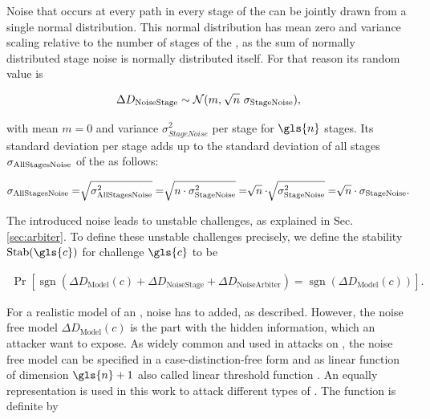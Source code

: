 Noise that occurs at every path in every stage of the \apuf can be jointly drawn from a single normal distribution.
This normal distribution has mean zero and variance scaling relative to the number of stages of the \apuf, as the sum of normally distributed stage noise is normally distributed itself.
For that reason its random value is 

\begin{align}
\Delta D_{\mathrm{Noise Stage}} \sim \mathcal{N} (m,\ \sqrt[]{n}\ \sigma_{\mathrm{Stage Noise}}), \label{equ:stagenoisedistribution}
\end{align}

with mean $m = 0$ and variance $\sigma_{Stage Noise}^2$ per stage for $\gls{n}$ stages.
Its standard deviation per stage adds up to the standard deviation of all stages $\sigma_{\mathrm{All Stages Noise}}$ of the \puf as follows:

\begin{align*}
\sigma_{\mathrm{All Stages Noise}} = \sqrt[]{\sigma_{\mathrm{All Stages Noise}}^2} = \sqrt[]{n \cdot \sigma_{\mathrm{Stage Noise}}^2} = \sqrt[]{n} \cdot \sqrt[]{\sigma_{\mathrm{Stage Noise}}^2} = \sqrt[]{n} \cdot \sigma_{\mathrm{Stage Noise}}.
\end{align*}

The introduced noise leads to unstable challenges, as explained in Sec. \ref{sec:arbiter}.
To define these unstable challenges precisely, we define the stability $\Stab(\gls{c})$ for challenge $\gls{c}$ to be

\begin{align}
\Pr[\operatorname{sgn}(\Delta D_{\mathrm{Model}}(c) + \Delta D_{\mathrm{Noise Stage}} + \Delta D_{\mathrm{Noise Arbiter}}) = \operatorname{sgn}(\Delta D_{\mathrm{Model}}(c))]. \label{equ:stability}
\end{align}

For a realistic model of an \apuf, noise has to added, as described. 
However, the noise free model $\Delta D_{\mathrm{Model}}(c)$ is the part with the hidden information, which an attacker want to expose. %
As widely common and used in attacks on \apuf, the noise free model can be specified in a case-distinction-free form and as linear function of dimension $\gls{n} + 1$ also called linear threshold function \cite{Majzoobi2008TestingSecurity, Majzoobi2008LightweightPUFs, Ruhrmair2010ModelingFunctions, Becker2015ThePUFs, Gassend2004IdentificationCircuits, Ganji2016PACPUFs}.
An equally representation is used in this work to attack different types of \apufs.
The function is definite by

